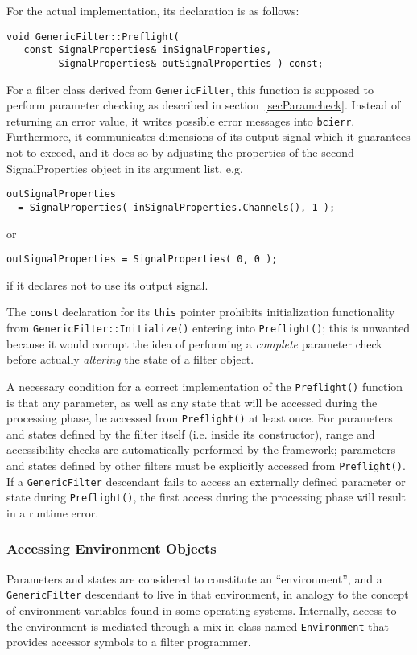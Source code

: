 \documentclass[12pt,a4paper]{article}
\begin{document}
For the actual implementation, its declaration is as follows:
\begin{verbatim}
void GenericFilter::Preflight(
   const SignalProperties& inSignalProperties,
         SignalProperties& outSignalProperties ) const;
\end{verbatim}

For a filter class derived from
\texttt{GenericFilter}, this function is supposed to perform
parameter checking as described in section~\ref{secParamcheck}.
Instead of returning an error value, it writes possible error
messages into \texttt{bcierr}.
Furthermore, it communicates dimensions of its output signal
which it guarantees not to exceed, and it does so by adjusting
the properties of the second SignalProperties object in its
argument list, e.g.
\begin{verbatim}
outSignalProperties
  = SignalProperties( inSignalProperties.Channels(), 1 );
\end{verbatim}
or
\begin{verbatim}
outSignalProperties = SignalProperties( 0, 0 );
\end{verbatim}
if it declares not to use its output signal.

The \texttt{const} declaration for its \texttt{this} pointer
prohibits initialization functionality from
\texttt{GenericFilter::Initialize()} entering into
\texttt{Preflight()}; this is unwanted because it would
corrupt the idea of performing a \textit{complete} parameter check
before actually \textit{altering} the state of a filter object.

A necessary condition for a correct implementation of the
\texttt{Preflight()} function is that any parameter, as well as any
state that will be accessed during the processing phase, be accessed
from \texttt{Preflight()} at least once. For parameters and states
defined by the filter itself (i.e. inside its constructor), range
and accessibility checks are automatically performed by the framework;
parameters and states defined by other filters must be explicitly accessed
from \texttt{Preflight()}. If a \texttt{GenericFilter} descendant fails to
access an externally defined parameter or state during \texttt{Preflight()},
the first access during the processing phase will result in a runtime error.

\subsubsection{Accessing Environment Objects}
Parameters and states are considered to constitute an ``environment'', and a
\texttt{GenericFilter} descendant to live in that environment, in analogy to
the concept of environment variables found in some operating systems.
Internally, access to the environment is mediated through a mix-in-class named
\texttt{Environment} that provides accessor symbols to a filter programmer.
\end{document}
